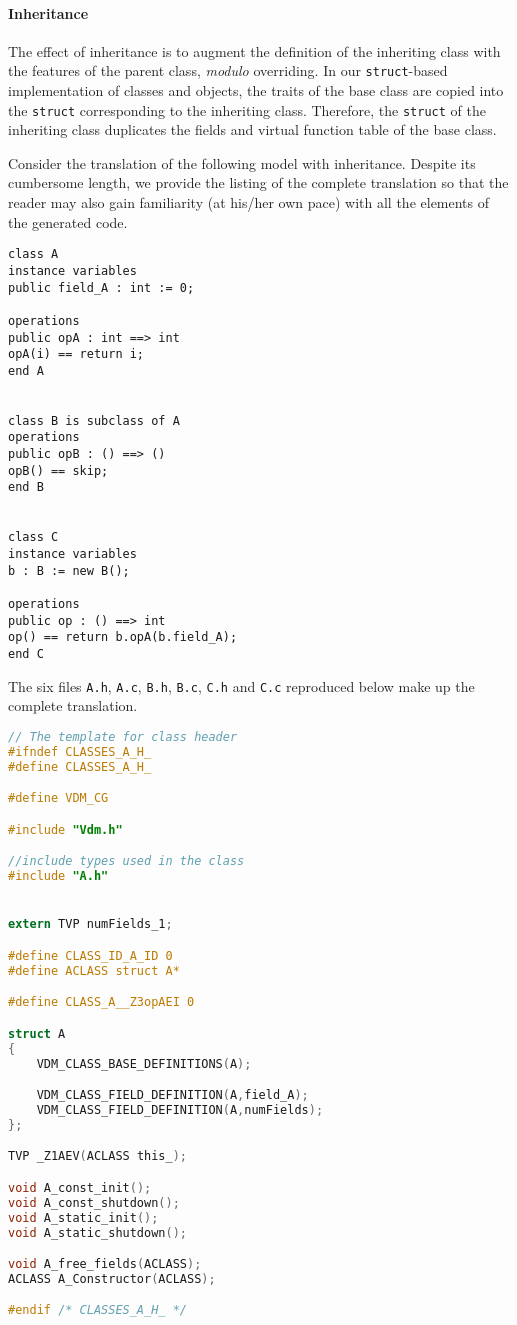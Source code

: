 \paragraph{Inheritance}
%
The effect of inheritance is to augment the definition of the inheriting class with the features of the parent class, \emph{modulo} overriding.
%
In our \texttt{struct}-based implementation of classes and objects, the traits of the base class are copied into the \texttt{struct} corresponding to the inheriting class.
%
Therefore, the \texttt{struct} of the inheriting class duplicates the fields and virtual function table of the base class.

Consider the translation of the following model with inheritance.
%
Despite its cumbersome length, we provide the listing of the complete translation so that the reader may also gain familiarity (at his/her own pace) with all the elements of the generated code.
%
%
%
\begin{lstlisting}[language=VDM++,frame=tlbr]
class A
instance variables
public field_A : int := 0;

operations
public opA : int ==> int
opA(i) == return i;
end A


class B is subclass of A
operations
public opB : () ==> ()
opB() == skip;
end B


class C
instance variables
b : B := new B();

operations
public op : () ==> int
op() == return b.opA(b.field_A);
end C
\end{lstlisting}
%
%
%
The six files \texttt{A.h}, \texttt{A.c}, \texttt{B.h}, \texttt{B.c}, \texttt{C.h} and \texttt{C.c} reproduced below make up the complete translation.
%
%
%
\begin{lstlisting}[language=C,frame=tlbr,caption="File A.h."]
// The template for class header
#ifndef CLASSES_A_H_
#define CLASSES_A_H_

#define VDM_CG

#include "Vdm.h"

//include types used in the class
#include "A.h"


extern TVP numFields_1;

#define CLASS_ID_A_ID 0
#define ACLASS struct A*

#define CLASS_A__Z3opAEI 0

struct A
{
	VDM_CLASS_BASE_DEFINITIONS(A);

	VDM_CLASS_FIELD_DEFINITION(A,field_A);
	VDM_CLASS_FIELD_DEFINITION(A,numFields);
};

TVP _Z1AEV(ACLASS this_);

void A_const_init();
void A_const_shutdown();
void A_static_init();
void A_static_shutdown();

void A_free_fields(ACLASS);
ACLASS A_Constructor(ACLASS);

#endif /* CLASSES_A_H_ */

\end{lstlisting}

